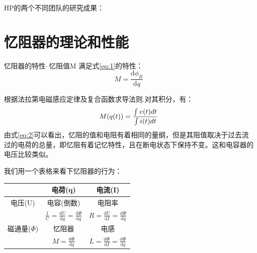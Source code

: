 \documentclass[UTF8]{article}
\begin{document}
HP的两个不同团队的研究成果：


%




\section{忆阻器的理论和性能}

忆阻器的特性--忆阻值M 满足式\eqref{eq:1}的特性：
\begin{equation}\label{eq:1}
M = \frac{\mathrm d\phi_{B}}{\mathrm dq}
\end{equation}

根据法拉第电磁感应定律及复合函数求导法则.对其积分，有：
\begin{equation}\label{eq:2}
M(q(t)) = \frac{\int\mathnormal{v(t)dt}}{\int\mathnormal{i(t)dt}}
\end{equation}
由式\eqref{eq:2}可以看出，忆阻的值和电阻有着相同的量纲，但是其阻值取决于过去流过的电荷的总量，即忆阻有着记忆特性，且在断电状态下保持不变。这和电容器的电压比较类似。

我们用一个表格来看下忆阻器的行为：

\begin{tabular}{|c|c|c|}
\hline
& 电荷(q)& 电流(I) \\

 \hline
电压(U)  & 电容(倒数) &电阻率 \\
     & $\frac{1}{C}=\frac{\mathrm{d}U}{\mathrm{d}q}=\frac{\mathrm{d}\dot \Phi}{\mathrm{d}q}$  &   $R=\frac{\mathrm{d}U}{\mathrm{d}I}=\frac{\mathrm{d}\dot \Phi}{\mathrm{d}\dot{q}}$ \\
 \hline
磁通量($\Phi$)  & 忆阻器 & 电感 \\
     & $M=\frac{\mathrm{d}\Phi}{\mathrm{d}q}$  &  $L=\frac{\mathrm{d}\Phi}{\mathrm{d}I}=\frac{\mathrm{d}\Phi}{\mathrm{d}\dot{q}}$ \\
 \hline

\end{tabular}

\end{document}
